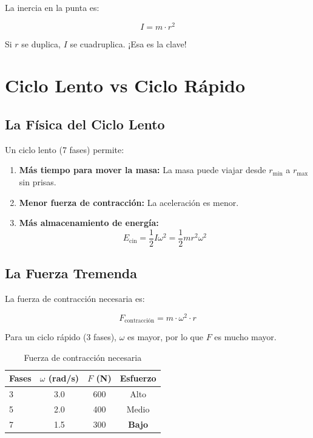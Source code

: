 \documentclass[12pt,a4paper]{article}
\begin{document}
La inercia en la punta es:

\begin{equation}
I = m \cdot r^2
\end{equation}

Si $r$ se duplica, $I$ se cuadruplica. ¡Esa es la clave!

\section{Ciclo Lento vs Ciclo Rápido}

\subsection{La Física del Ciclo Lento}

Un ciclo lento (7 fases) permite:

\begin{enumerate}
    \item \textbf{Más tiempo para mover la masa:} La masa puede viajar desde $r_{\text{min}}$ a $r_{\text{max}}$ sin prisas.
    \item \textbf{Menor fuerza de contracción:} La aceleración es menor.
    \item \textbf{Más almacenamiento de energía:} 
    \begin{equation}
    E_{\text{cin}} = \frac{1}{2} I \omega^2 = \frac{1}{2} m r^2 \omega^2
    \end{equation}
\end{enumerate}

\subsection{La Fuerza Tremenda}

La fuerza de contracción necesaria es:

\begin{equation}
F_{\text{contracción}} = m \cdot \omega^2 \cdot r
\end{equation}

Para un ciclo rápido (3 fases), $\omega$ es mayor, por lo que $F$ es mucho mayor.

\begin{table}[H]
\centering
\caption{Fuerza de contracción necesaria}
\label{tab:fuerza}
\begin{tabular}{@{}lccc@{}}
\toprule
\textbf{Fases} & $\omega$ (rad/s) & $F$ (N) & \textbf{Esfuerzo} \\
\midrule
3 & 3.0 & 600 & Alto \\
5 & 2.0 & 400 & Medio \\
7 & 1.5 & 300 & \textbf{Bajo} \\
\bottomrule
\end{tabular}
\end{table}
\end{document}
